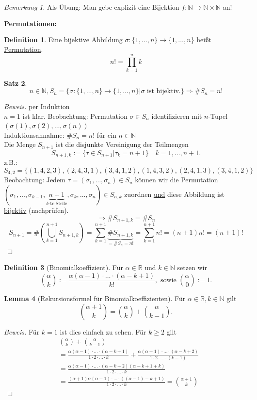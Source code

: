 \documentclass[12pt,a4paper,titlepage]{article} %
\theoremstyle{definition}
\newtheorem{satz}{Satz}[subsection]
\newtheorem{lem}[satz]{Lemma}
\newtheorem{defi}[satz]{Definition}
\theoremstyle{remark}
\newtheorem*{bem}{Bemerkung}
\newenvironment{bew}{\begin{proof}[Beweis]}{\end{proof}}
\newcommand{\N}{\mathbb{N}}
\newcommand{\R}{\mathbb{R}}
\begin{document}
\begin{bem}
	Als Übung: Man gebe explizit eine Bijektion \(f : \N \rightarrow \N \times \N\) an!
\end{bem}
\textbf{Permutationen:}
\begin{defi}
	Eine bijektive Abbildung \(\sigma : \{1,\ldots,n\} \rightarrow \{1,\ldots,n\}\) heißt \underline{Permutation}.
	\[n! = \prod_{k=1}^{n}k\]
\end{defi}
\begin{satz}
	\[n\in\N, S_n = \{\sigma: \{1,\ldots,n\}\rightarrow\{1,\ldots,n\} | \sigma \text{ ist bijektiv.}\} \Rightarrow \# S_n = n!\]
\end{satz}
\begin{bew} per Induktion\\
	\(n = 1\) ist klar.
	Beobachtung: Permutation \(\sigma \in S_n\) identifizieren mit \(n\)-Tupel \( (\sigma(1), \sigma(2), \ldots, \sigma(n))\)\\
	Induktionsannahme: \(\# S_n = n!\) für ein \(n\in\N\)\\
	Die Menge \(S_{n+1}\) ist die disjunkte Vereinigung der Teilmengen 
	\[S_{n+1, k} := \{\tau \in S_{n+1} | \tau_k = n+1 \} \quad k = 1,\ldots, n+1.\]
	z.B.: \[S_{4,2} = \{ (1,4,2,3), (2,4,3,1), (3,4,1,2), (1,4,3,2), (2,4,1,3), (3,4,1,2) \}\]
	Beobachtung: Jedem \(\tau = (\sigma_1,\ldots,\sigma_n)\in S_n\) können wir die Permutation \( (\sigma_1, \ldots, \sigma_{k-1}, \underbrace{n+1}_{k\text{-te Stelle}}, \sigma_k, \ldots, \sigma_n) \in S_{n,k} \) zuordnen \underline{und} diese Abbildung ist \underline{bijektiv} (nachprüfen).
	\[\Rightarrow \# S_{n+1,k} = \# S_n \]
	\[ S_{n+1} = \# (\bigcup_{k=1}^{n+1} S_{n+1,k} ) = \sum_{k=1}^{n+1} \underbrace{\# S_{n+1,k}}_{=\#S_n = n!} = \sum_{k=1}^{n+1} n! = (n+1)n! = (n+1)! \]
\end{bew}
\begin{defi}[Binomialkoeffizient]
	Für \(\alpha \in\R \) und \( k\in\N \) setzen wir
	\[ \binom{\alpha}{k} := \frac{\alpha(\alpha-1)\cdot\ldots\cdot(\alpha-k+1)}{k!}, \text{ sowie } \binom{\alpha}{0} := 1. \]
\end{defi}
\begin{lem}[Rekursionsformel für Binomialkoeffizienten]
	Für \( \alpha\in\R, k\in\N \) gilt \[ \binom{\alpha + 1}{k} = \binom{\alpha}{k} + \binom{\alpha}{k-1}. \]
\end{lem}
\begin{bew}
	Für \(k=1\) ist dies einfach zu sehen. Für \(k\geq 2\) gilt 
	\begin{align*}
		&\binom{\alpha}{k} + \binom{\alpha}{k-1} \\
		&= \frac{\alpha (\alpha-1)\cdot\ldots\cdot(\alpha-k+1)}{1\cdot2\cdot\ldots\cdot k} + \frac{\alpha (\alpha-1)\cdot\ldots\cdot(\alpha-k+2)}{1\cdot2\cdot\ldots\cdot (k-1)}\\
		&= \frac{\alpha (\alpha-1)\cdot\ldots\cdot(\alpha-k+2)(\alpha-k+1+k)}{1\cdot2\cdot\ldots\cdot k}\\
		&= \frac{(\alpha + 1)\alpha (\alpha-1)\cdot\ldots\cdot((\alpha-1)-k+1)}{1\cdot2\cdot\ldots\cdot k} = \binom{\alpha + 1}{k}
	\end{align*}
\end{bew}
\end{document}
